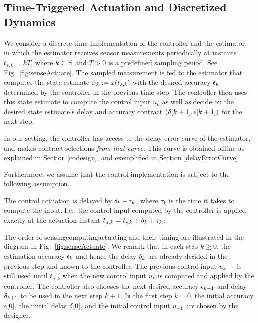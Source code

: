 \subsection{Time-Triggered Actuation and Discretized Dynamics}
We consider a discrete time implementation of the controller and the estimator, in which the estimator receives sensor measurements periodically at instants $t_{s,k}=kT$,
where $k\in\mathbb{N}$ and $T>0$ is a predefined sampling period.
See Fig.~\ref{fig:senseActuate}.
The sampled measurement is fed to the estimator that computes the state
estimate $\hat{x}_{k}:=\hat{x}(t_{s,k})$ with the desired
accuracy $\epsilon_k$ determined by the controller
in the previous time step. 
The controller then uses this state estimate
to compute the control input $u_{k}$ as well as decide on the desired
state estimate's delay and accuracy contract $(\delta[k+1],\epsilon[k+1])$ for the next step. 

In our setting, the controller has access to the delay-error curve of the estimator, and makes contract selections \emph{from that curve}. 
This curve is obtained offline as explained in Section \ref{codesign}, and exemplified in Section \ref{delayErrorCurve}.

Furthermore, we assume that the control implementation
is subject to the following assumption.
\begin{ass}
	The control actuation is delayed by $\delta_k+\tau_k$, where $\tau_k$ is the time it takes to compute the input.
	I.e., the control input computed by the controller is applied exactly
	at the actuation instant $t_{a,k}=t_{s,k}+\delta_k+\tau_k$.
\end{ass}

The order of sensing\textendash{}computing\textendash{}actuating and
their timing are illustrated in the diagram in Fig.~\ref{fig:senseActuate}.
We remark that in each step $k\geq0$, the estimation accuracy $\epsilon_k$
and hence the delay $\delta_k$ are already decided in the previous
step and known to the controller. 
The previous control input $u_{k-1}$
is still used until $t_{a,k}$ when the new control input $u_{k}$
is computed and applied by the controller. 
The controller also chooses
the next desired accuracy $\epsilon_{k+1}$ and delay $\delta_{k+1}$
to be used in the next step $k+1$. 
In the first step $k=0$, the
initial accuracy $\epsilon[0]$, the initial delay $\delta[0]$, and
the initial control input $u_{-1}$ are chosen by the designer.







